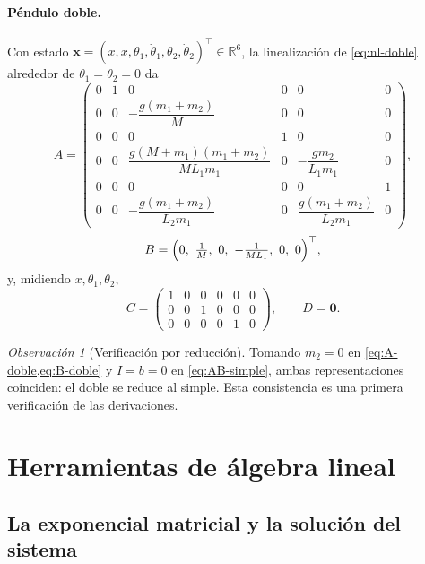\documentclass[11pt,letterpaper]{article}
\theoremstyle{definition}
\theoremstyle{plain}
\theoremstyle{remark}
\newtheorem{observacion}[definicion]{Observación}
\newcommand{\R}{\mathbb{R}}
\newcommand{\xv}{\bm{x}}
\begin{document}
\paragraph{Péndulo doble.} Con estado
$\xv=(x,\dot x,\theta_1,\dot\theta_1,\theta_2,\dot\theta_2)^\top\in\R^6$,
la linealización de \cref{eq:nl-doble} alrededor de
$\theta_1=\theta_2=0$ da
\begin{equation}\label{eq:A-doble}
A=\!\begin{pmatrix}
0&1&0&0&0&0\\[1pt]
0&0&-\dfrac{g(m_1{+}m_2)}{M}&0&0&0\\[6pt]
0&0&0&1&0&0\\[1pt]
0&0&\dfrac{g(M{+}m_1)(m_1{+}m_2)}{ML_1 m_1}&0&-\dfrac{g m_2}{L_1 m_1}&0\\[6pt]
0&0&0&0&0&1\\[1pt]
0&0&-\dfrac{g(m_1{+}m_2)}{L_2 m_1}&0&\dfrac{g(m_1{+}m_2)}{L_2 m_1}&0
\end{pmatrix},
\end{equation}
\begin{equation}\label{eq:B-doble}
B=\Bigl(0,\ \tfrac1M,\ 0,\ -\tfrac{1}{ML_1},\ 0,\ 0\Bigr)^\top,
\end{equation}
y, midiendo $x,\theta_1,\theta_2$,
\begin{equation}\label{eq:C-doble}
  C=\begin{pmatrix}
  1&0&0&0&0&0\\0&0&1&0&0&0\\0&0&0&0&1&0\end{pmatrix},\qquad D=\bm 0.
\end{equation}

\begin{observacion}[Verificación por reducción]
Tomando $m_2=0$ en \cref{eq:A-doble,eq:B-doble} y $I=b=0$ en
\cref{eq:AB-simple}, ambas representaciones coinciden: el doble se reduce
al simple. Esta consistencia es una primera verificación de las
derivaciones.
\end{observacion}

\section{Herramientas de álgebra lineal}
\label{sec:herr}

\subsection{La exponencial matricial y la solución del sistema}
\label{sub:expm}
\end{document}
